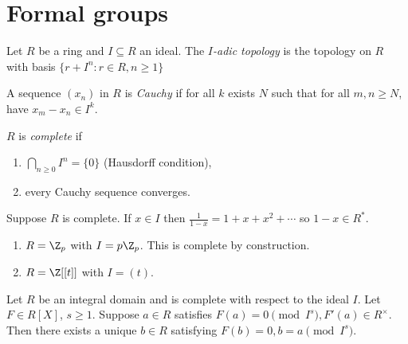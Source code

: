 \documentclass[a4paper]{article}
\theoremstyle{definition}
\theoremstyle{theorem}
\begin{document}
\section{Formal groups}

\begin{definition}
  Let \(R\) be a ring and \(I \subseteq R\) an ideal. The \emph{\(I\)-adic topology} is the topology on \(R\) with basis \(\{r + I^n: r \in R, n \geq 1\}\)
\end{definition}

\begin{definition}
  A sequence \((x_n)\) in \(R\) is \emph{Cauchy} if for all \(k\) exists \(N\) such that for all \(m, n \geq N\), have \(x_m - x_n \in I^k\).
\end{definition}

\begin{definition}
  \(R\) is \emph{complete} if
  \begin{enumerate}
  \item \(\bigcap_{n \geq 0} I^n = \{0\}\) (Hausdorff condition),
  \item every Cauchy sequence converges.
  \end{enumerate}
\end{definition}

\begin{remark}
  Suppose \(R\) is complete. If \(x \in I\) then \(\frac{1}{1 - x} = 1 + x + x^2 + \cdots\) so \(1 - x \in R^*\).
\end{remark}

\begin{eg}\leavevmode
  \begin{enumerate}
  \item \(R = \Z_p\) with \(I = p\Z_p\). This is complete by construction.
  \item \(R = \Z[[t]]\) with \(I = (t)\).
  \end{enumerate}
\end{eg}

\begin{lemma}
  Let \(R\) be an integral domain and is complete with respect to the ideal \(I\). Let \(F \in R[X]\), \(s \geq 1\). Suppose \(a \in R\) satisfies \(F(a) = 0 \pmod{I^s}, F'(a) \in R^\times\). Then there exists a unique \(b \in R\) satisfying \(F(b) = 0, b = a \pmod{I^s}\).
\end{lemma}
\end{document}
